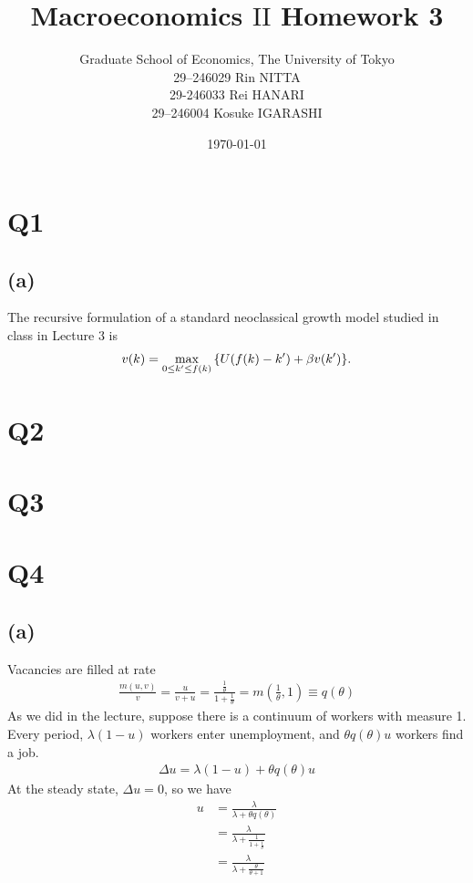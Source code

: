 \documentclass{ltjsarticle}
\title{Macroeconomics $\mathrm{II}$ Homework 3}
\date{\today}
\author{Graduate School of Economics, The University of Tokyo\\[4mm]29--246029 Rin NITTA\\ 29-246033 Rei HANARI \\ 29--246004 Kosuke IGARASHI}
\begin{document}
\maketitle
\section*{Q1}
\subsection*{(a)}


The recursive formulation of a standard neoclassical growth
model studied in class in Lecture 3 is
\begin{align*}
    v(k)=\max_{0\leq k'\leq f(k)} \qty{U(f(k)-k')+\beta v(k')}.
\end{align*}

\section*{Q2}

\section*{Q3}

\section*{Q4}

\subsection*{(a)}

Vacancies are filled at rate
\begin{gather*}
  \frac{m(u,v)}{v} = \frac{u}{v+u} = \frac{\frac{1}{\theta}}{1+\frac{1}{\theta}} = m \left(\frac{1}{\theta}, 1\right) \equiv q(\theta)
\end{gather*}
As we did in the lecture, suppose there is a continuum of workers with measure 1. Every period, $\lambda(1-u)$ workers enter unemployment, and $\theta q(\theta) u $ workers find a job.
\begin{gather*}
  \Delta u = \lambda(1-u) + \theta q(\theta) u
\end{gather*}
At the steady state, $\Delta u = 0$, so we have
\begin{align*}
  u 
  &= \frac{\lambda}{\lambda + \theta q(\theta)}\\
  &= \frac{\lambda}{\lambda + \frac{1}{1+\frac{1}{\theta}}}\\
  &= \frac{\lambda}{\lambda + \frac{\theta}{\theta+1}}
\end{align*}
\end{document}
